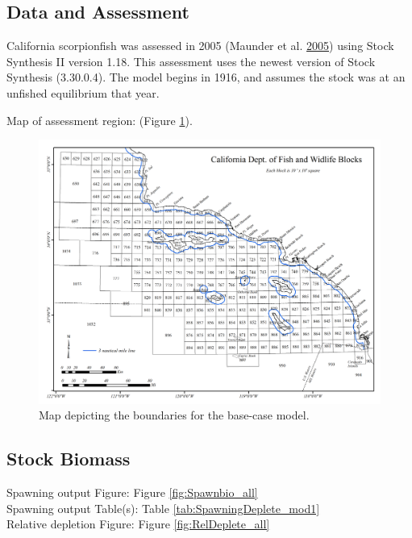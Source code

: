 \documentclass[12pt,]{article}
\begin{document}
\FloatBarrier

\newpage

\subsection*{Data and Assessment}\label{data-and-assessment}

California scorpionfish was assessed in 2005 (Maunder et al.
\protect\hyperlink{ref-Maunder2005}{2005}) using Stock Synthesis II
version 1.18. This assessment uses the newest version of Stock Synthesis
(3.30.0.4). The model begins in 1916, and assumes the stock was at an
unfished equilibrium that year.

Map of assessment region: (Figure \ref{fig:assess_region_map}).

\begin{figure}[htbp]
\centering
\includegraphics{Figures/assess_region_map.png}
\caption{Map depicting the boundaries for the base-case model.
\label{fig:assess_region_map}}
\end{figure}

\FloatBarrier

\subsection*{Stock Biomass}\label{stock-biomass}

Spawning output Figure: Figure \ref{fig:Spawnbio_all}\\
Spawning output Table(s): Table \ref{tab:SpawningDeplete_mod1}\\
Relative depletion Figure: Figure \ref{fig:RelDeplete_all}
\end{document}
